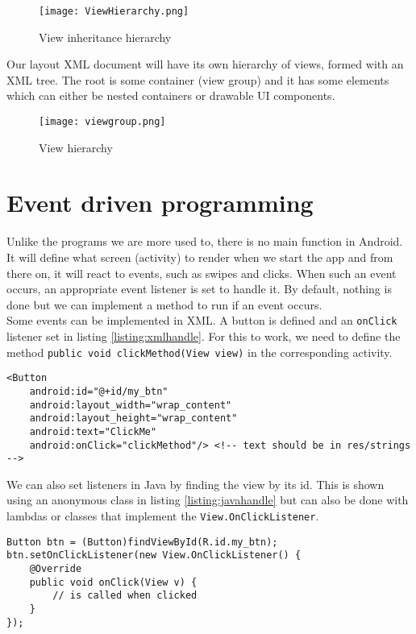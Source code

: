 \begin{figure}[H]
\centering
\texttt{[image: ViewHierarchy.png]}
\caption{View inheritance hierarchy}
\label{fig:inherhia}
\end{figure}

Our layout XML document will have its own hierarchy of views, formed with an XML tree. The root is some container (view group) and it has some elements which can either be nested containers or drawable UI components. 

\begin{figure}[H]
  \centering
  \texttt{[image: viewgroup.png]}
  \caption{View hierarchy}
  \label{fig:viewhia}
\end{figure}

\section{Event driven programming}
Unlike the programs we are more used to, there is no main function in Android. It will define what screen (activity) to render when we start the app and from there on, it will react to events, such as swipes and clicks. When such an event occurs, an appropriate event listener is set to handle it. By default, nothing is done but we can implement a method to run if an event occurs.\\

Some events can be implemented in XML. A button is defined and an \texttt{onClick} listener set in listing \ref{listing:xmlhandle}. For this to work, we need to define the method \texttt{public void clickMethod(View view)} in the corresponding activity.
\begin{lstlisting}[style=A_XML, caption={Handling events in XML}, label = {listing:xmlhandle}]
<Button
    android:id="@+id/my_btn"
    android:layout_width="wrap_content"
    android:layout_height="wrap_content"
    android:text="ClickMe" 
    android:onClick="clickMethod"/> <!-- text should be in res/strings -->
\end{lstlisting}
We can also set listeners in Java by finding the view by its id. This is shown using an anonymous class in listing \ref{listing:javahandle} but can also be done with lambdas or classes that implement the \texttt{View.OnClickListener}.
\begin{lstlisting}[style=A_Java, caption={Handling events in Java}, label = {listing:javahandle}]
Button btn = (Button)findViewById(R.id.my_btn);
btn.setOnClickListener(new View.OnClickListener() {
    @Override
    public void onClick(View v) {
        // is called when clicked
    }
});
\end{lstlisting}

